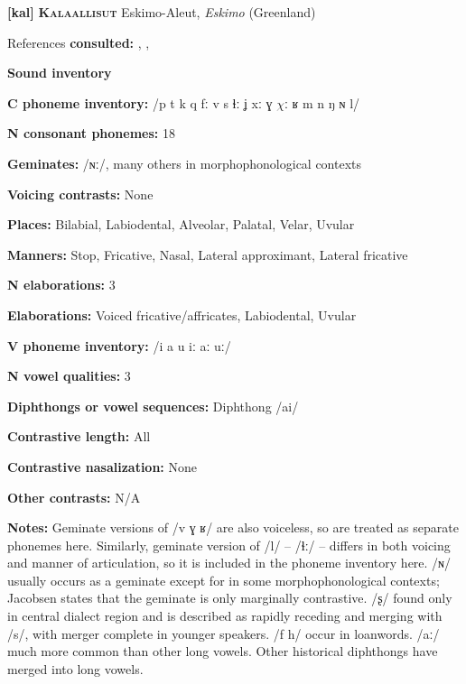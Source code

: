 \textbf{[kal]}   \textbf{\textsc{Kalaallisut}}    Eskimo-Aleut, \textit{Eskimo} (Greenland)



References \textbf{consulted:} \citet{Fortescue1984}, \citet{Hagerup2011}, \citet{Jacobsen2000}



\textbf{Sound inventory}



\textbf{C phoneme inventory:} /p t k q fː v s ɬː ʝ xː ɣ $\chi ː$ ʁ m n ŋ ɴ l/



\textbf{N consonant phonemes:} 18



\textbf{Geminates:} /ɴː/, many others in morphophonological contexts



\textbf{Voicing contrasts:} None



\textbf{Places:} Bilabial, Labiodental, Alveolar, Palatal, Velar, Uvular



\textbf{Manners:} Stop, Fricative, Nasal, Lateral approximant, Lateral fricative 



\textbf{N elaborations:} 3



\textbf{Elaborations:} Voiced fricative/affricates, Labiodental, Uvular



\textbf{V phoneme inventory:} /i a u iː aː uː/



\textbf{N vowel qualities:} 3



\textbf{Diphthongs or vowel sequences:} Diphthong /ai/



\textbf{Contrastive length:} All



\textbf{Contrastive nasalization:} None



\textbf{Other contrasts:} N/A



\textbf{Notes:} Geminate versions of /v ɣ ʁ/ are also voiceless, so are treated as separate phonemes here. Similarly, geminate version of /l/ -- /ɬː/ -- differs in both voicing and manner of articulation, so it is included in the phoneme inventory here. /ɴ/ usually occurs as a geminate except for in some morphophonological contexts; Jacobsen states that the geminate is only marginally contrastive. /ʂ/ found only in central dialect region and is described as rapidly receding and merging with /s/, with merger complete in younger speakers. /f h/ occur in loanwords. /aː/ much more common than other long vowels. Other historical diphthongs have merged into long vowels.



